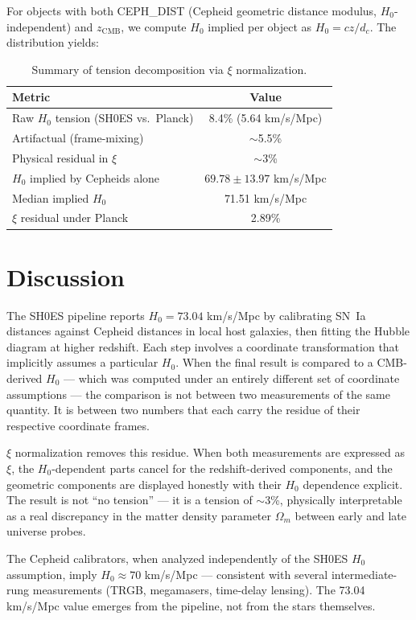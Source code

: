\documentclass[12pt,a4paper]{article}
\begin{document}
For objects with both CEPH\_DIST (Cepheid geometric distance modulus,
$H_0$-independent) and $z_\mathrm{CMB}$, we compute $H_0$ implied per object
as $H_0 = cz/d_c$. The distribution yields:

\begin{table}[h]
\centering
\begin{tabular}{lc}
\toprule
Metric & Value \\
\midrule
Raw $H_0$ tension (SH0ES vs.\ Planck) & 8.4\% (5.64 km/s/Mpc) \\
Artifactual (frame-mixing) & $\sim$5.5\% \\
Physical residual in $\xi$ & $\sim$3\% \\
$H_0$ implied by Cepheids alone & $69.78 \pm 13.97$ km/s/Mpc \\
Median implied $H_0$ & 71.51 km/s/Mpc \\
$\xi$ residual under Planck & 2.89\% \\
\bottomrule
\end{tabular}
\caption{Summary of tension decomposition via $\xi$ normalization.}
\end{table}

\section{Discussion}

The SH0ES pipeline reports $H_0 = 73.04$ km/s/Mpc by calibrating SN~Ia
distances against Cepheid distances in local host galaxies, then fitting the
Hubble diagram at higher redshift. Each step involves a coordinate
transformation that implicitly assumes a particular $H_0$. When the final
result is compared to a CMB-derived $H_0$ --- which was computed under an
entirely different set of coordinate assumptions --- the comparison is not
between two measurements of the same quantity. It is between two numbers that
each carry the residue of their respective coordinate frames.

$\xi$ normalization removes this residue. When both measurements are expressed
as $\xi$, the $H_0$-dependent parts cancel for the redshift-derived components,
and the geometric components are displayed honestly with their $H_0$ dependence
explicit. The result is not ``no tension'' --- it is a tension of $\sim$3\%,
physically interpretable as a real discrepancy in the matter density parameter
$\Omega_m$ between early and late universe probes.

The Cepheid calibrators, when analyzed independently of the SH0ES $H_0$
assumption, imply $H_0 \approx 70$ km/s/Mpc --- consistent with several
intermediate-rung measurements (TRGB, megamasers, time-delay lensing). The
73.04 km/s/Mpc value emerges from the pipeline, not from the stars themselves.
\end{document}
